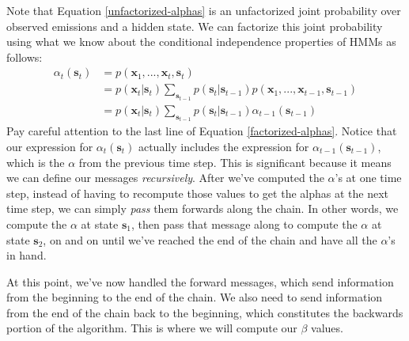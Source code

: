 Note that Equation \ref{unfactorized-alphas} is an unfactorized joint probability over observed emissions and a hidden state. We can factorize this joint probability using what we know about the conditional independence properties of HMMs as follows:
\begin{align} \label{factorized-alphas}
	\alpha_t(\textbf{s}_t) &= p(\textbf{x}_1, ..., \textbf{x}_t, \textbf{s}_t) \\
	&= p(\textbf{x}_t | \textbf{s}_t) \sum_{\textbf{s}_{t-1}} p(\textbf{s}_t | \textbf{s}_{t-1}) p(\textbf{x}_1, ..., \textbf{x}_{t-1}, \textbf{s}_{t-1}) \\
	&= p(\textbf{x}_t | \textbf{s}_t) \sum_{\textbf{s}_{t-1}} p(\textbf{s}_t | \textbf{s}_{t-1}) \alpha_{t-1}(\textbf{s}_{t-1})
\end{align}
Pay careful attention to the last line of Equation \ref{factorized-alphas}. Notice that our expression for $\alpha_t(\textbf{s}_t)$ actually includes the expression for $\alpha_{t-1}(\textbf{s}_{t-1})$, which is the $\alpha$ from the previous time step. This is significant because it means we can define our messages \textit{recursively}. After we've computed the $\alpha$'s at one time step, instead of having to recompute those values to get the alphas at the next time step, we can simply \textit{pass} them forwards along the chain. In other words, we compute the $\alpha$ at state $\textbf{s}_1$, then pass that message along to compute the $\alpha$ at state $\textbf{s}_2$, on and on until we've reached the end of the chain and have all the $\alpha$'s in hand.

At this point, we've now handled the forward messages, which send information from the beginning to the end of the chain. We also need to send information from the end of the chain back to the beginning, which constitutes the backwards portion of the algorithm. This is where we will compute our $\beta$ values.

